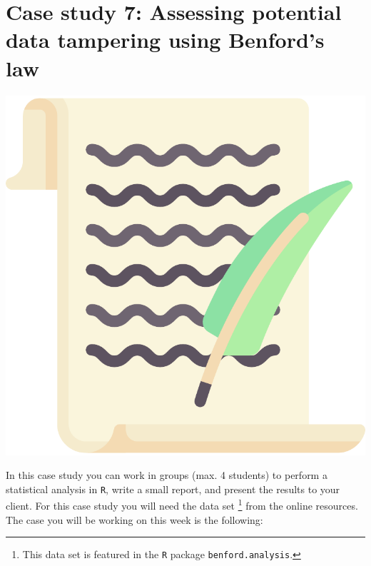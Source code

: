 
\begin{minipage}{0.8\textwidth}
\section{Case study 7: Assessing potential data tampering using Benford's law}
\end{minipage}%
\hfill%
\begin{minipage}{0.1\textwidth}
\includegraphics[width=\linewidth]{Files/Images/lettericon.pdf}
\end{minipage}
\vspace*{.1cm}

In this case study you can work in groups (max. 4 students) to perform a statistical analysis in \texttt{R}, write a small report, and present the results to your client. For this case study you will need the data set \footnote{This data set is featured in the \texttt{R} package \texttt{benford.analysis}.} from the online resources. The case you will be working on this week is the following: \\

